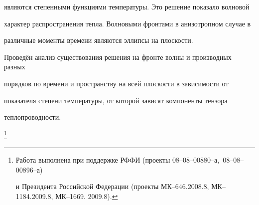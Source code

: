 являются степенными функциями температуры. Это решение показало волновой 

характер распространения тепла. Волновыми фронтами в анизотропном случае в 

различные моменты времени являются эллипсы на плоскости. 



Проведён анализ существования решения на фронте волны и производных разных 

порядков по времени и пространству на всей плоскости в зависимости от 

показателя степени температуры, от которой зависят компоненты тензора 

теплопроводности.





\thanks{Работа выполнена при поддержке РФФИ {\rm(}проекты \mbox{\rm 08--08--00880--а, 08--08--00896--а)} 

и Президента Российской Федерации  {\rm(}проекты {\rm МК--646.2008.8, МК--1184.2009.8, МК--1669. 2009.8).}}





